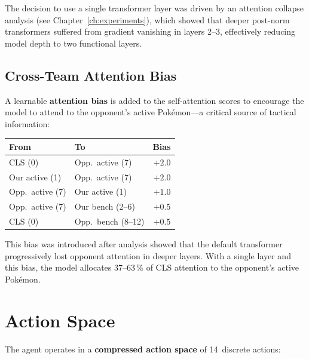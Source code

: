 The decision to use a single transformer layer was driven by an attention
collapse analysis (see Chapter~\ref{ch:experiments}), which showed that deeper
post-norm transformers suffered from gradient vanishing in layers 2--3,
effectively reducing model depth to two functional layers.

\subsection{Cross-Team Attention Bias}

A learnable \textbf{attention bias} is added to the self-attention scores to
encourage the model to attend to the opponent's active Pok\'{e}mon---a
critical source of tactical information:

\begin{center}
\small
\begin{tabularx}{0.7\textwidth}{l l r}
  \toprule
  \textbf{From} & \textbf{To} & \textbf{Bias} \\
  \midrule
  CLS (0)         & Opp.\ active (7)  & $+2.0$ \\
  Our active (1)  & Opp.\ active (7)  & $+2.0$ \\
  Opp.\ active (7) & Our active (1)   & $+1.0$ \\
  Opp.\ active (7) & Our bench (2--6) & $+0.5$ \\
  CLS (0)         & Opp.\ bench (8--12) & $+0.5$ \\
  \bottomrule
\end{tabularx}
\end{center}

This bias was introduced after analysis showed that the default transformer
progressively lost opponent attention in deeper layers.  With a single layer
and this bias, the model allocates 37--63\,\% of CLS attention to the
opponent's active Pok\'{e}mon.


\section{Action Space}
\label{sec:action_space}

The agent operates in a \textbf{compressed action space} of 14~discrete
actions:

